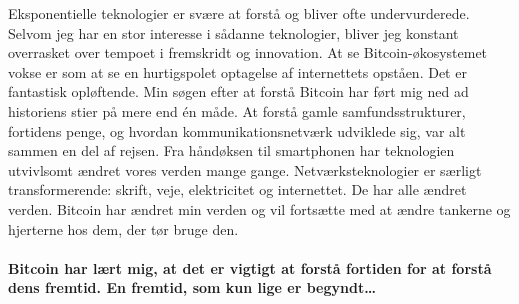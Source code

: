 \documentclass[paper=6in:9in,pagesize=pdftex,
               headinclude=on,footinclude=on,12pt]{scrbook}
\begin{document}
Eksponentielle teknologier er svære at forstå og bliver ofte undervurderede. Selvom jeg har en stor interesse i sådanne teknologier, bliver jeg konstant overrasket over tempoet i fremskridt og innovation. At se Bitcoin-økosystemet vokse er som at se en hurtigspolet optagelse af internettets opståen. Det er fantastisk opløftende.
\newpage
Min søgen efter at forstå Bitcoin har ført mig ned ad historiens stier på mere end \'en måde. At forstå gamle samfundsstrukturer, fortidens penge, og hvordan kommunikationsnetværk udviklede sig, var alt sammen en del af rejsen. Fra håndøksen til smartphonen har teknologien utvivlsomt ændret vores verden mange gange. Netværksteknologier er særligt transformerende: skrift, veje, elektricitet og internettet. De har alle ændret verden. Bitcoin har ændret min verden og vil fortsætte med at ændre tankerne og hjerterne hos dem, der tør bruge den.\paragraph{Bitcoin har lært mig, at det er vigtigt at forstå fortiden for at forstå dens fremtid. En fremtid, som kun lige er begyndt\ldots}%
%
%
%
%
%
\end{document}
